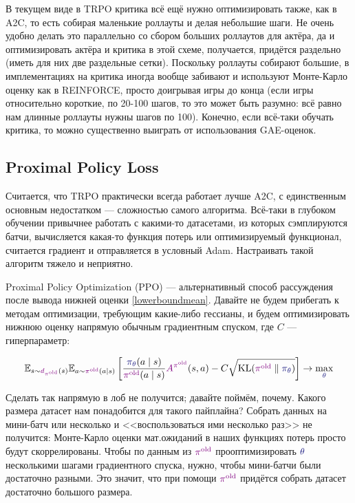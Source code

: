 \begin{remark}
В текущем виде в TRPO критика всё ещё нужно оптимизировать также, как в A2C, то есть собирая маленькие роллауты и делая небольшие шаги. Не очень удобно делать это параллельно со сбором больших роллаутов для актёра, да и оптимизировать актёра и критика в этой схеме, получается, придётся раздельно (иметь для них две раздельные сетки). Поскольку роллауты собирают большие, в имплементациях на критика иногда вообще забивают и используют Монте-Карло оценку как в REINFORCE, просто доигрывая игры до конца (если игры относительно короткие, по 20-100 шагов, то это может быть разумно: всё равно нам длинные роллауты нужны шагов по 100). Конечно, если всё-таки обучать критика, то можно существенно выиграть от использования GAE-оценок.
\end{remark}

\subsection{Proximal Policy Loss}

Считается, что TRPO практически всегда работает лучше A2C, с единственным основным недостатком --- сложностью самого алгоритма. Всё-таки в глубоком обучении привычнее работать с какими-то датасетами, из которых сэмплируются батчи, вычисляется какая-то функция потерь или оптимизируемый функционал, считается градиент и отправляется в условный Adam. Настраивать такой алгоритм тяжело и неприятно.

Proximal Policy Optimization (PPO) --- альтернативный способ рассуждения после вывода нижней оценки \eqref{lowerboundmean}. Давайте не будем прибегать к методам оптимизации, требующим какие-либо гессианы, и будем оптимизировать нижнюю оценку напрямую обычным градиентным спуском, где $C$ --- гиперпараметр:

\begin{equation}\label{lowerboundunconstrained}
\E_{s \sim \textcolor{ChadPurple}{d_{\pi^{\old}}}(s)} \E_{a \sim \textcolor{ChadPurple}{\pi^{\old}}(a \mid s)} \left[ \frac{\textcolor{ChadBlue}{\pi_\theta}(a \mid s)}{\textcolor{ChadPurple}{\pi^{\old}}(a \mid s)} \textcolor{ChadPurple}{A^{\pi^{\old}}}(s, a) - C \sqrt{\KL(\textcolor{ChadPurple}{\pi^{\old}} \parallel \textcolor{ChadBlue}{\pi_\theta})} \right] \to \max_{\textcolor{ChadBlue}{\theta}}
\end{equation}

Сделать так напрямую в лоб не получится; давайте поймём, почему. Какого размера датасет нам понадобится для такого пайплайна? Собрать данных на мини-батч или несколько и <<воспользоваться ими несколько раз>> не получится: Монте-Карло оценки мат.ожиданий в наших функциях потерь просто будут скоррелированы. Чтобы по данным из $\textcolor{ChadPurple}{\pi^{\old}}$ прооптимизировать $\textcolor{ChadBlue}{\theta}$ несколькими шагами градиентного спуска, нужно, чтобы мини-батчи были достаточно разными. Это значит, что при помощи $\textcolor{ChadPurple}{\pi^{\old}}$ придётся собрать датасет достаточно большого размера.

